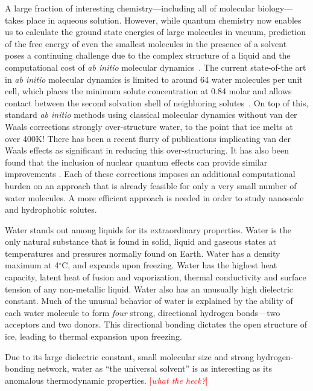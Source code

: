 \documentclass[letterpaper,twocolumn,amsmath,amssymb,prb]{revtex4-1}
\newcommand{\fixme}[1]{\textcolor{red}{[\emph{#1}]}}
\begin{document}
A large fraction of interesting chemistry---including all of molecular
biology---takes place in aqueous solution.  However, while quantum
chemistry now enables us to calculate the ground state energies of
large molecules in vacuum, prediction of the free energy of even the
smallest molecules in the presence of a solvent poses a continuing
challenge due to the complex structure of a liquid and the
computational cost of \emph{ab initio} molecular
dynamics~\cite{car1985, grossman2004}.  The current state-of-the art
in \emph{ab initio} molecular dynamics is limited to around 64 water
molecules per unit cell, which places the minimum solute concentration
at 0.84 molar and allows contact between the second solvation shell of
neighboring solutes~\cite{izvekov2005, choe2007}.  On top of this,
standard \emph{ab initio} methods using classical molecular dynamics
without van der Waals corrections strongly over-structure water, to
the point that ice melts at over 400K\cite{yoo2009phase}!  There has
been a recent flurry of publications implicating van der Waals effects
as significant in reducing this
over-structuring\cite{lin2009importance, wang2011density,
  mogelhoj2011ab, jonchiere2011van}.  It has also been found that the
inclusion of nuclear quantum effects can provide similar improvements
\cite{morrone2008nuclear}.  Each of these corrections imposes an
additional computational burden on an approach that is already
feasible for only a very small number of water molecules. A more
efficient approach is needed in order to study nanoscale and
hydrophobic solutes.

Water stands out among liquids for its extraordinary properties.
Water is the only natural substance that is found in solid, liquid and
gaseous states at temperatures and pressures normally found on Earth.
Water has a density maximum at 4$^\circ$C, and expands upon freezing.
Water has the highest heat capacity, latent heat of fusion and
vaporization, thermal conductivity and surface tension of any
non-metallic liquid.  Water also has an unusually high dielectric constant.
Much of the unusual behavior of water is explained by the ability of
each water molecule to form \emph{four} strong, directional hydrogen
bonds---two acceptors and two donors.  This directional bonding
dictates the open structure of ice, leading to thermal expansion upon
freezing.

Due to its large dielectric constant, small molecular size and strong
hydrogen-bonding network, water as ``the universal solvent'' is as
interesting as its anomalous thermodynamic properties.  \fixme{what
  the heck?}
\end{document}
